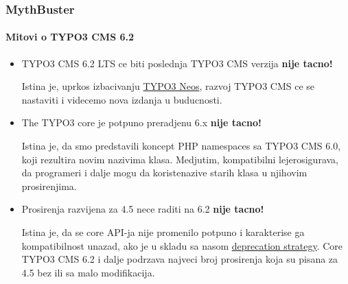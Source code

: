 \begin{frame}[fragile]
	\frametitle{MythBuster}
	\framesubtitle{Mitovi o TYPO3 CMS 6.2}

	\begin{itemize}
		\item TYPO3 CMS 6.2 LTS ce biti poslednja TYPO3 CMS verzija
			\tabto{8cm}\color{red}\textbf{\textrightarrow nije tacno!}\color{black}

			\smaller
				Istina je, uprkos izbacivanju \href{http://neos.typo3.org}{TYPO3 Neos}, razvoj TYPO3 CMS ce se nastaviti i videcemo nova izdanja u buducnosti.
			\normalsize

		\item The TYPO3 core je potpuno preradjenu 6.x
			\tabto{8cm}\color{red}\textbf{\textrightarrow nije tacno!}\color{black}

			\smaller
				Istina je, da smo predstavili koncept PHP namespaces sa TYPO3 CMS 6.0, koji rezultira novim nazivima klasa. Medjutim, kompatibilni lejerosigurava, da programeri i dalje mogu da koristenazive starih klasa u njihovim prosirenjima.
			\normalsize

		\item Prosirenja razvijena za  4.5 nece raditi na 6.2
			\tabto{8cm}\color{red}\textbf{\textrightarrow nije tacno!}\color{black}

			\smaller
				Istina je, da se core API-ja nije promenilo potpuno i karakterise ga kompatibilnost unazad, ako je u skladu sa nasom \href{http://forge.typo3.org/projects/typo3v4-core/wiki/CoreDevPolicy}{deprecation strategy}. Core TYPO3 CMS 6.2 i dalje podrzava najveci broj prosirenja koja su pisana za 4.5 bez ili sa malo modifikacija.
			\normalsize

	\end{itemize}

\end{frame}


